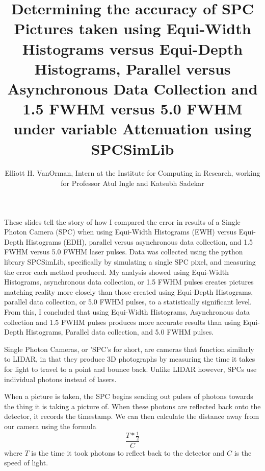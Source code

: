 \documentclass{beamer}
\title{Determining the accuracy of SPC Pictures taken using Equi-Width Histograms versus Equi-Depth Histograms, Parallel versus Asynchronous Data Collection and 1.5 FWHM versus 5.0 FWHM under variable Attenuation using SPCSimLib \cite{spc}}
\author{Elliott H. VanOrman, Intern at the Institute for Computing in Research, working for Professor Atul Ingle and Katsubh Sadekar}
\begin{document}
\maketitle

\begin{frame}
\end{frame}

\begin{frame}
  These slides tell the story of how I compared the error in results of a Single Photon Camera (SPC) when using Equi-Width Histograms (EWH) versus Equi-Depth Histograms (EDH), parallel versus asynchronous data collection, and 1.5 FWHM versus 5.0 FWHM laser pulses.
  Data was collected using the python library SPCSimLib, specifically by simulating a single SPC pixel, and measuring the error each method produced.
  My analysis showed using Equi-Width Histograms, asynchronous data collection, or 1.5 FWHM pulses creates pictures matching reality more closely than those created using Equi-Depth Histograms, parallel data collection, or 5.0 FWHM pulses, to a statistically significant level.
  From this, I concluded that using Equi-Width Histograms, Asynchronous data collection and 1.5 FWHM pulses produces more accurate results than using Equi-Depth Histograms, Parallel data collection, and 5.0 FWHM pulses.
\end{frame}

\begin{frame}
\end{frame}

\begin{frame}
  Single Photon Cameras, or 'SPC's for short, are cameras that function similarly to LIDAR, in that they produce 3D photographs by measuring the time it takes for light to travel to a point and bounce back. Unlike LIDAR however, SPCs use individual photons instead of lasers. \cite{ingle} \cite{sadekar}
  
  When a picture is taken, the SPC begins sending out pulses of photons towards the thing it is taking a picture of. When these photons are reflected back onto the detector, it records the timestamp. We can then calculate the distance away from our camera using the formula\[\frac{T*\frac{1}{2}}{C}\] where $T$ is the time it took photons to reflect back to the detector and $C$ is the speed of light. \cite{sadekar}
\end{frame}
\end{document}
